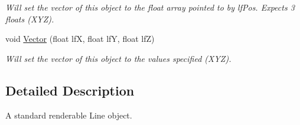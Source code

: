 \begin{DoxyCompactItemize}
\begin{DoxyCompactList}\small\item\em Will set the vector of this object to the float array pointed to by lfPos. Expects 3 floats (XYZ). \end{DoxyCompactList}\item 
\hypertarget{classc_line_aa9b3156e1504378683e34aa8c2f38ec2}{
void \hyperlink{classc_line_aa9b3156e1504378683e34aa8c2f38ec2}{Vector} (float lfX, float lfY, float lfZ)}
\label{classc_line_aa9b3156e1504378683e34aa8c2f38ec2}

\begin{DoxyCompactList}\small\item\em Will set the vector of this object to the values specified (XYZ). \end{DoxyCompactList}\end{DoxyCompactItemize}


\subsection{Detailed Description}
A standard renderable Line object. 